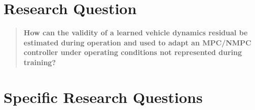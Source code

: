\documentclass[12pt,a4paper]{report}
\begin{document}
\section{Research Question}

%
\begin{quote}
\textbf{How can the validity of a learned vehicle dynamics residual be estimated during operation and used to adapt an MPC/NMPC controller under operating conditions not represented during training?}
\end{quote}


\section{Specific Research Questions}
\end{document}
